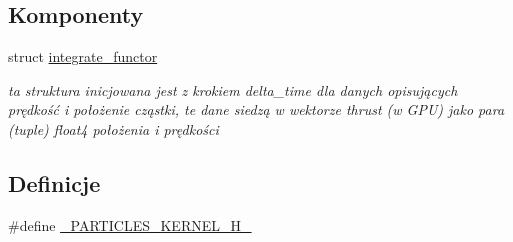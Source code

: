 \subsection*{Komponenty}
\begin{DoxyCompactItemize}
\item 
struct \hyperlink{structintegrate__functor}{integrate\-\_\-functor}
\begin{DoxyCompactList}\small\item\em ta struktura inicjowana jest z krokiem delta\-\_\-time dla danych opisujących prędkość i położenie cząstki, te dane siedzą w wektorze thrust (w G\-P\-U) jako para (tuple) float4 położenia i prędkości \end{DoxyCompactList}\end{DoxyCompactItemize}
\subsection*{Definicje}
\begin{DoxyCompactItemize}
\item 
\#define \hyperlink{particles__kernel__impl_8cuh_a5de512cb982bf8e9102c9e80ae68a7f2}{\-\_\-\-P\-A\-R\-T\-I\-C\-L\-E\-S\-\_\-\-K\-E\-R\-N\-E\-L\-\_\-\-H\-\_\-}
\end{DoxyCompactItemize}
